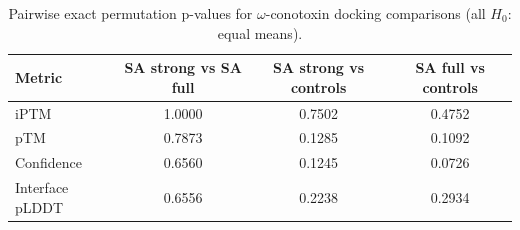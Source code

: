 \begin{table}[ht]
  \centering
  \caption{Pairwise exact permutation p-values for $\omega$-conotoxin docking comparisons (all $H_0$: equal means).}
  \label{tab:docking-permutation-pvalues}
  \begin{tabular}{lccc}
    \toprule
    \textbf{Metric} & \textbf{SA strong vs SA full} & \textbf{SA strong vs controls} & \textbf{SA full vs controls} \\
    \midrule
    iPTM & 1.0000 & 0.7502 & 0.4752 \\
    pTM & 0.7873 & 0.1285 & 0.1092 \\
    Confidence & 0.6560 & 0.1245 & 0.0726 \\
    Interface pLDDT & 0.6556 & 0.2238 & 0.2934 \\
    \bottomrule
  \end{tabular}
\end{table}
